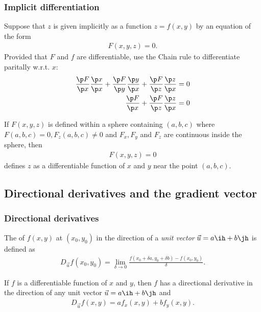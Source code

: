 \documentclass{article}
\begin{document}
\subsubsection{Implicit differentiation}

\begin{definition}
    Suppose that $z$ is given implicitly as a function $z=f(x,y)$ by an
    equation of the form
    \begin{align*}
        F(x,y,z)=0.
    \end{align*}
    Provided that $F$ and $f$ are differentiable, use the Chain rule to
    differentiate paritally w.r.t. $x$:
    \begin{align*}
        \frac{\p F}{\p x}\frac{\p x}{\p x}+\frac{\p F}{\p y}\frac{\p y}{\p x}
        + \frac{\p F}{\p z}\frac{\p z}{\p x} &= 0\\
        \frac{\p F}{\p x} + \frac{\p F}{\p z}\frac{\p z}{\p x} &= 0
    \end{align*}
\end{definition}
\begin{theorem}
    If $F(x,y,z)$ is defined within a sphere containing $(a,b,c)$
    where $F(a,b,c)=0, F_z(a,b,c)\not=0$ and $F_x,F_y$ and $F_z$ are
    continuous inside the sphere, then
    \begin{align*}
        F(x,y,z)=0
    \end{align*} 
    defines $z$ as a differentiable function of $x$ and $y$ near the
    point $(a,b,c)$.
\end{theorem}


\subsection{Directional derivatives and the gradient vector}


\subsubsection{Directional derivatives}

\begin{definition}
    The  of $f(x,y)$ at $(x_0,y_0)$ in the
    direction of a \emph{unit vector} $\vec u=a\ih + b\jh$ is defined as
    \begin{align*}
        D_{\vec u}f(x_0, y_0)=\lim_{\delta \to 0}
        \frac{f(x_0+\delta a, y_0 + \delta b)-f(x_0, y_0)}{\delta}.
    \end{align*}
\end{definition}
\begin{theorem}
    If $f$ is a differentiable function of $x$ and $y$, then $f$
    has a directional derivative in the direction of any unit vector
    $\vec u=a\ih + b\jh$ and
    \begin{align*}
        D_{\vec u}f(x,y) = af_x(x,y) + bf_y(x,y).
    \end{align*}
\end{theorem}
\end{document}
